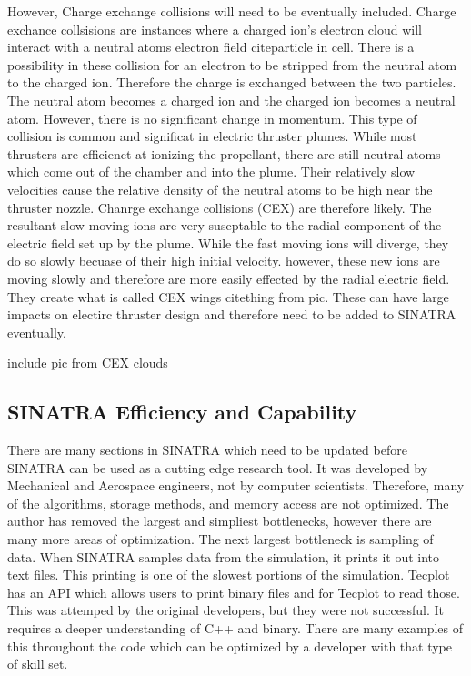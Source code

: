 \indent However, Charge exchange collisions will need to be eventually included. Charge exchance collsisions are instances where a charged ion's electron cloud will interact with a neutral atoms electron field cite{particle in cell}. There is a possibility in these collision for an electron to be stripped from the neutral atom to the charged ion. Therefore the charge is exchanged between the two particles. The neutral atom becomes a charged ion and the charged ion becomes a neutral atom. However, there is no significant change in momentum. This type of collision is common and significat in electric thruster plumes. While most thrusters are efficienct at ionizing the propellant, there are still neutral atoms which come out of the chamber and into the plume. Their relatively slow velocities cause the relative density of the neutral atoms to be high near the thruster nozzle. Chanrge exchange collisions (CEX) are therefore likely. The resultant slow moving ions are very suseptable to the radial component of the electric field set up by the plume. While the fast moving ions will diverge, they do so slowly becuase of their high initial velocity. however, these new ions are moving slowly and therefore are more easily effected by the radial electric field. They create what is called CEX wings cite{thing from pic}. These can have large impacts on electirc thruster design and therefore need to be added to SINATRA eventually. 

include pic from CEX clouds


\subsection{SINATRA Efficiency and Capability}

There are many sections in SINATRA which need to be updated before SINATRA can be used as a cutting edge research tool. It was developed by Mechanical and Aerospace engineers, not by computer scientists. Therefore, many of the algorithms, storage methods, and memory access are not optimized. The author has removed the largest and simpliest bottlenecks, however there are many more areas of optimization. The next largest bottleneck is sampling of data. When SINATRA samples data from the simulation, it prints it out into text files. This printing is one of the slowest portions of the simulation. Tecplot has an API which allows users to print binary files and for Tecplot to read those. This was attemped by the original developers, but they were not successful. It requires a deeper understanding of C++ and binary. There are many examples of this throughout the code which can be optimized by a developer with that type of skill set. \par

